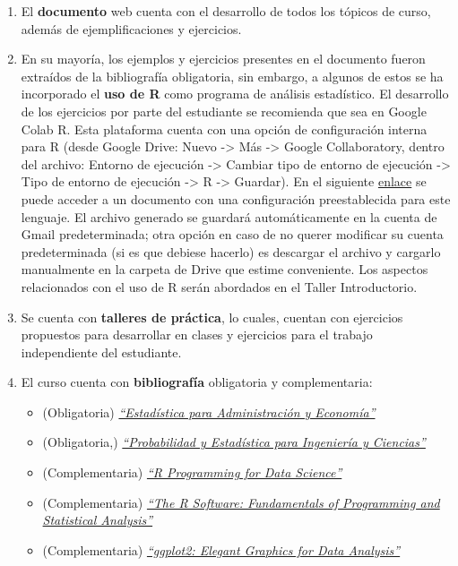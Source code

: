 \documentclass[
  11pt,
]{book}
\theoremstyle{definition}
\theoremstyle{definition}
\theoremstyle{definition}
\theoremstyle{definition}
\theoremstyle{remark}
\begin{document}
\begin{enumerate}
\def\labelenumi{\arabic{enumi}.}
\item
  El \textbf{documento} web cuenta con el desarrollo de todos los tópicos de curso, además de ejemplificaciones y ejercicios.
\item
  En su mayoría, los ejemplos y ejercicios presentes en el documento fueron extraídos de la bibliografía obligatoria, sin embargo, a algunos de estos se ha incorporado el \textbf{uso de R} como programa de análisis estadístico. El desarrollo de los ejercicios por parte del estudiante se recomienda que sea en Google Colab R. Esta plataforma cuenta con una opción de configuración interna para R (desde Google Drive: Nuevo -\textgreater{} Más -\textgreater{} Google Collaboratory, dentro del archivo: Entorno de ejecución -\textgreater{} Cambiar tipo de entorno de ejecución -\textgreater{} Tipo de entorno de ejecución -\textgreater{} R -\textgreater{} Guardar). En el siguiente \href{https://colab.research.google.com/notebook\#create=true&language=r}{enlace} se puede acceder a un documento con una configuración preestablecida para este lenguaje. El archivo generado se guardará automáticamente en la cuenta de Gmail predeterminada; otra opción en caso de no querer modificar su cuenta predeterminada (si es que debiese hacerlo) es descargar el archivo y cargarlo manualmente en la carpeta de Drive que estime conveniente. Los aspectos relacionados con el uso de R serán abordados en el Taller Introductorio.
\item
  Se cuenta con \textbf{talleres de práctica}, lo cuales, cuentan con ejercicios propuestos para desarrollar en clases y ejercicios para el trabajo independiente del estudiante.
\item
  El curso cuenta con \textbf{bibliografía} obligatoria y complementaria:

  \begin{itemize}
  \item
    (Obligatoria) \href{https://github.com/Dfranzani/Bases-de-datos-para-cursos/blob/main/Libros/Anderson\%2C\%20Estad\%C3\%ADstica.pdf}{\emph{``Estadística para Administración y Economía''}} \citep{anderson}
  \item
    (Obligatoria,) \href{https://github.com/Dfranzani/Bases-de-datos-para-cursos/blob/main/Libros/Devore\%2C\%20Probabilidad\%20y\%20Estad\%C3\%ADstica.pdf}{\emph{``Probabilidad y Estadística para Ingeniería y Ciencias''}} \citep{Devore}
  \item
    (Complementaria) \href{https://bookdown.org/rdpeng/rprogdatascience/}{\emph{``R Programming for Data Science''}} \citep{peng2016r}
  \item
    (Complementaria) \href{https://github.com/Dfranzani/Bases-de-datos-para-cursos/blob/main/Libros/Micheaux\%2C\%20Manual\%20de\%20R.pdf}{\emph{``The R Software: Fundamentals of Programming and Statistical Analysis''}} \citep{deMicheaux2013}
  \item
    (Complementaria) \href{https://ggplot2-book.org/}{\emph{``ggplot2: Elegant Graphics for Data Analysis''}} \citep{wickham_ggplot2_2009}
  \end{itemize}


\end{enumerate}
\end{document}
